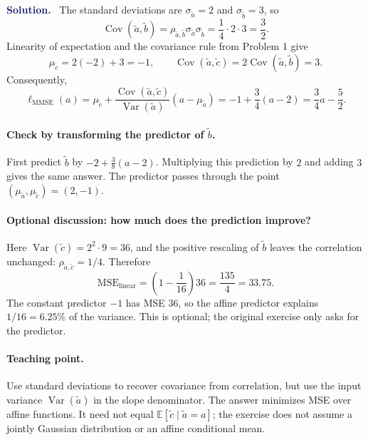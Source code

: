 \documentclass[11pt]{article}
\newcommand{\E}{\mathbb{E}}
\newcommand{\Var}{\operatorname{Var}}
\newcommand{\Cov}{\operatorname{Cov}}
\newcommand{\rv}[1]{\widetilde{#1}}
\newcommand{\lmmse}{\ell_{\mathrm{MMSE}}}
\newenvironment{answer}{%
    \par\medskip\noindent\textcolor{MidnightBlue}{\textbf{Solution.}}\ }
    {\par\medskip}
\begin{document}
\begin{answer}
The standard deviations are $\sigma_{\rv{a}}=2$ and
$\sigma_{\rv{b}}=3$, so
\[
  \Cov(\rv{a},\rv{b})
  =\rho_{\rv{a},\rv{b}}\sigma_{\rv{a}}\sigma_{\rv{b}}
  =\frac14\cdot2\cdot3=\frac32.
\]
Linearity of expectation and the covariance rule from Problem 1 give
\[
  \mu_{\rv{c}}=2(-2)+3=-1,\qquad
  \Cov(\rv{a},\rv{c})
  =2\Cov(\rv{a},\rv{b})=3.
\]
Consequently,
\[
  \boxed{\lmmse(a)
  =\mu_{\rv{c}}+\frac{\Cov(\rv{a},\rv{c})}{\Var(\rv{a})}
      (a-\mu_{\rv{a}})
  =-1+\frac34(a-2)=\frac34a-\frac52.}
\]

\paragraph{Check by transforming the predictor of $\rv{b}$.}
First predict $\rv{b}$ by
$-2+\frac38(a-2)$. Multiplying this prediction by $2$ and adding $3$
gives the same answer. The predictor passes through the point
$(\mu_{\rv{a}},\mu_{\rv{c}})=(2,-1)$.

\paragraph{Optional discussion: how much does the prediction improve?}
Here $\Var(\rv{c})=2^2\cdot9=36$, and the positive rescaling of
$\rv{b}$ leaves the correlation unchanged:
$\rho_{\rv{a},\rv{c}}=1/4$. Therefore
\[
  \mathrm{MSE}_{\mathrm{linear}}
  =\left(1-\frac1{16}\right)36
  =\frac{135}{4}=33.75.
\]
The constant predictor $-1$ has MSE $36$, so the affine predictor explains
$1/16=6.25\%$ of the variance. This is optional; the original exercise
only asks for the predictor.

\paragraph{Teaching point.}
Use standard deviations to recover covariance from correlation, but use
the input variance $\Var(\rv{a})$ in the slope denominator. The answer
minimizes MSE over affine functions. It need not equal
$\E[\rv{c}\mid\rv{a}=a]$; the exercise does not assume a jointly
Gaussian distribution or an affine conditional mean.
\end{answer}

\newpage
\end{document}
